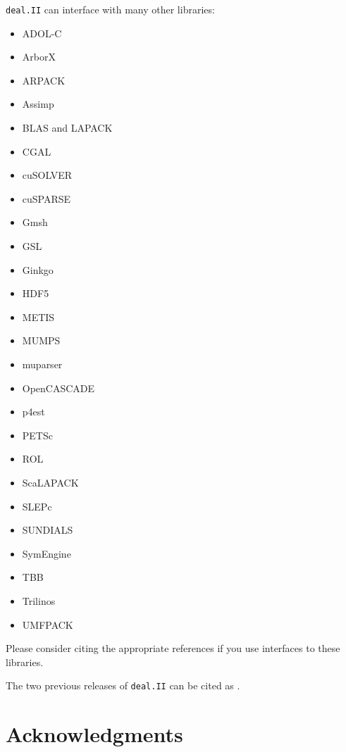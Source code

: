 \documentclass{ansarticle-preprint}
\newcommand{\specialword}[1]{\texttt{#1}}
\newcommand{\dealii}{{\specialword{deal.II}}\xspace}
\begin{document}
\dealii{} can interface with many other libraries:
\begin{multicols}{3}
  \begin{itemize}
    \item ADOL-C \cite{Griewank1996a,adol-c}
    \item ArborX \cite{lebrun2020arborx}
    \item ARPACK \cite{arpack}
    \item Assimp \cite{assimp}
    \item BLAS and LAPACK \cite{lapack}
    \item CGAL \cite{cgal}
    \item cuSOLVER \cite{cusolver}
    \item cuSPARSE \cite{cusparse}
    \item Gmsh \cite{geuzaine2009gmsh}
    \item GSL \cite{gsl2016}
    \item Ginkgo \cite{ginkgo-web-page}
    \item HDF5 \cite{hdf5}
    \item METIS \cite{karypis1998fast}
    \item MUMPS \cite{ADE00,MUMPS:1,MUMPS:2,mumps-web-page}
    \item muparser \cite{muparser-web-page}
    \item OpenCASCADE \cite{opencascade-web-page}
    \item p4est \cite{p4est}
    \item PETSc \cite{petsc-user-ref,petsc-web-page}
    \item ROL \cite{ridzal2014rapid}
    \item ScaLAPACK \cite{slug}
    \item SLEPc \cite{Hernandez:2005:SSF}
    \item SUNDIALS \cite{sundials}
    \item SymEngine \cite{symengine-web-page}
    \item TBB \cite{Rei07}
    \item Trilinos \cite{trilinos,trilinos-web-page}
    \item UMFPACK \cite{umfpack}
  \end{itemize}
\end{multicols}
Please consider citing the appropriate references if you use
interfaces to these libraries.

The two previous releases of \dealii{} can be cited as
\cite{dealII92,dealII93}.


\section{Acknowledgments}
\end{document}
